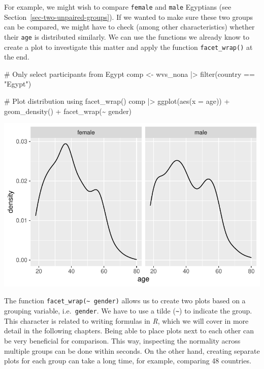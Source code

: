 \documentclass[
  letterpaper,
]{krantz}
\makeatletter
\newenvironment{Shaded}{\begin{snugshade}}{\end{snugshade}}
\newcommand{\AttributeTok}[1]{\textcolor[rgb]{0.40,0.45,0.13}{#1}}
\newcommand{\CommentTok}[1]{\textcolor[rgb]{0.37,0.37,0.37}{#1}}
\newcommand{\FunctionTok}[1]{\textcolor[rgb]{0.28,0.35,0.67}{#1}}
\newcommand{\NormalTok}[1]{\textcolor[rgb]{0.00,0.23,0.31}{#1}}
\newcommand{\OtherTok}[1]{\textcolor[rgb]{0.00,0.23,0.31}{#1}}
\newcommand{\SpecialCharTok}[1]{\textcolor[rgb]{0.37,0.37,0.37}{#1}}
\newcommand{\StringTok}[1]{\textcolor[rgb]{0.13,0.47,0.30}{#1}}
\newenvironment{kframe}{%
\medskip{}
\setlength{\fboxsep}{.8em}
 \def\at@end@of@kframe{}%
 \ifinner\ifhmode%
  \def\at@end@of@kframe{\end{minipage}}%
  \begin{minipage}{\columnwidth}%
 \fi\fi%
 \def\FrameCommand##1{\hskip\@totalleftmargin \hskip-\fboxsep
 \colorbox{shadecolor}{##1}\hskip-\fboxsep
     \hskip-\linewidth \hskip-\@totalleftmargin \hskip\columnwidth}%
 \MakeFramed {\advance\hsize-\width
   \@totalleftmargin\z@ \linewidth\hsize
   \@setminipage}}%
 {\par\unskip\endMakeFramed%
 \at@end@of@kframe}
\renewenvironment{Shaded}{\begin{kframe}}{\end{kframe}}
\makeatother
\begin{document}
For example, we might wish to compare \texttt{female} and \texttt{male}
Egyptians (see Section~\ref{sec-two-unpaired-groups}). If we wanted to
make sure these two groups can be compared, we might have to check
(among other characteristics) whether their \texttt{age} is distributed
similarly. We can use the functions we already know to create a plot to
investigate this matter and apply the function \texttt{facet\_wrap()} at
the end.

\begin{Shaded}
\begin{Highlighting}[]
\CommentTok{\# Only select participants from \textquotesingle{}Egypt\textquotesingle{}}
\NormalTok{comp }\OtherTok{\textless{}{-}}
\NormalTok{  wvs\_nona }\SpecialCharTok{|\textgreater{}}
  \FunctionTok{filter}\NormalTok{(country }\SpecialCharTok{==} \StringTok{"Egypt"}\NormalTok{)}

\CommentTok{\# Plot distribution using facet\_wrap()}
\NormalTok{comp }\SpecialCharTok{|\textgreater{}}
  \FunctionTok{ggplot}\NormalTok{(}\FunctionTok{aes}\NormalTok{(}\AttributeTok{x =}\NormalTok{ age)) }\SpecialCharTok{+}
  \FunctionTok{geom\_density}\NormalTok{() }\SpecialCharTok{+}
  \FunctionTok{facet\_wrap}\NormalTok{(}\SpecialCharTok{\textasciitilde{}}\NormalTok{ gender)}
\end{Highlighting}
\end{Shaded}

\includegraphics{11_group_comparison_files/figure-pdf/comparability-of-egyptians-filter-1.pdf}

The function \texttt{facet\_wrap(\textasciitilde{}\ gender)} allows us
to create two plots based on a grouping variable, i.e.~\texttt{gender}.
We have to use a tilde (\texttt{\textasciitilde{}}) to indicate the
group. This character is related to writing formulas in \emph{R}, which
we will cover in more detail in the following chapters. Being able to
place plots next to each other can be very beneficial for comparison.
This way, inspecting the normality across multiple groups can be done
within seconds. On the other hand, creating separate plots for each
group can take a long time, for example, comparing 48 countries.
\end{document}
